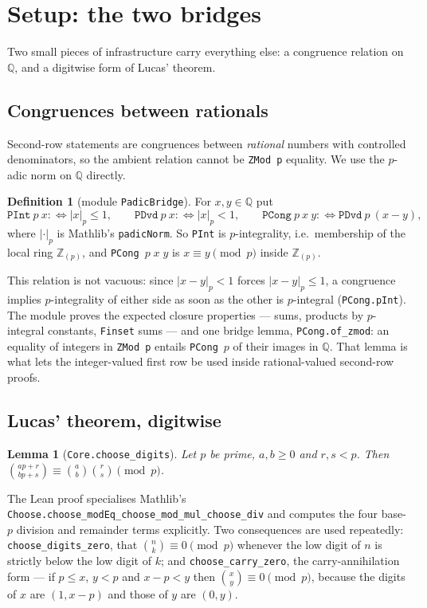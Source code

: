 \documentclass[11pt,reqno]{amsart}
\theoremstyle{plain}
\newtheorem{lemma}[theorem]{Lemma}
\theoremstyle{definition}
\newtheorem{definition}[theorem]{Definition}
\theoremstyle{remark}
\newcommand{\Z}{\mathbb{Z}}
\newcommand{\Q}{\mathbb{Q}}
\newcommand{\bin}[2]{\binom{#1}{#2}}
\newcommand{\Ln}[1]{\texttt{#1}}
\numberwithin{equation}{section}
\begin{document}
\section{Setup: the two bridges}
\label{sec:setup}

Two small pieces of infrastructure carry everything else: a congruence relation on $\Q$, and
a digitwise form of Lucas' theorem.

\subsection{Congruences between rationals}

Second-row statements are congruences between \emph{rational} numbers with controlled
denominators, so the ambient relation cannot be \Ln{ZMod p} equality. We use the $p$-adic
norm on $\Q$ directly.

\begin{definition}[module \Ln{PadicBridge}]\label{def:bridge}
For $x,y\in\Q$ put
\[
  \Ln{PInt}\ p\ x:\iff\lvert x\rvert_p\le1,\qquad
  \Ln{PDvd}\ p\ x:\iff\lvert x\rvert_p<1,\qquad
  \Ln{PCong}\ p\ x\ y:\iff\Ln{PDvd}\ p\ (x-y),
\]
where $\lvert\cdot\rvert_p$ is Mathlib's \Ln{padicNorm}. So \Ln{PInt} is $p$-integrality,
i.e.\ membership of the local ring $\Z_{(p)}$, and \Ln{PCong}~$p\;x\;y$ is $x\equiv y\pmod
p$ inside $\Z_{(p)}$.
\end{definition}

This relation is not vacuous: since $\lvert x-y\rvert_p<1$ forces $\lvert x-y\rvert_p\le1$,
a congruence implies $p$-integrality of either side as soon as the other is $p$-integral
(\Ln{PCong.pInt}). The module proves the expected closure properties --- sums, products by
$p$-integral constants, \Ln{Finset} sums --- and one bridge lemma, \Ln{PCong.of\_zmod}:
an equality of integers in \Ln{ZMod p} entails \Ln{PCong}~$p$ of their images in $\Q$. That
lemma is what lets the integer-valued first row be used inside rational-valued second-row
proofs.

\subsection{Lucas' theorem, digitwise}

\begin{lemma}[\Ln{Core.choose\_digits}]\label{lem:lucasstep}
Let $p$ be prime, $a,b\ge0$ and $r,s<p$. Then
$\bin{ap+r}{bp+s}\equiv\bin ab\bin rs\pmod p$.
\end{lemma}

The Lean proof specialises Mathlib's
\Ln{Choose.choose\_modEq\_choose\_mod\_mul\_choose\_div} and computes the four base-$p$
division and remainder terms explicitly. Two consequences are used repeatedly:
\Ln{choose\_digits\_zero}, that $\bin nk\equiv0\pmod p$ whenever the low digit of $n$ is
strictly below the low digit of $k$; and \Ln{choose\_carry\_zero}, the carry-annihilation
form --- if $p\le x$, $y<p$ and $x-p<y$ then $\bin xy\equiv0\pmod p$, because the digits of
$x$ are $(1,x-p)$ and those of $y$ are $(0,y)$.
\end{document}
